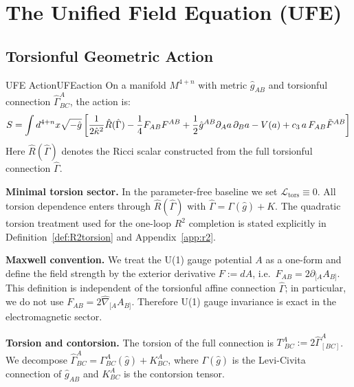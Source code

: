 \section{The Unified Field Equation (UFE)}

\subsection{Torsionful Geometric Action}

\begin{definition}{UFE Action}{UFEaction}
On a manifold $M^{4+n}$ with metric $\hat{g}_{AB}$ and torsionful connection 
$\hat{\Gamma}^A_{BC}$, the action is:
\begin{equation}
    S = \int d^{4+n}x\sqrt{-\hat{g}}\left[
        \frac{1}{2\hat{\kappa}^2}\hat{R}(\hat{\Gamma}) 
        - \frac{1}{4}F_{AB}F^{AB}
        + \frac{1}{2}\hat{g}^{AB}\partial_A a\,\partial_B a 
        - V(a) 
        + c_3\, a\, F_{AB}\tilde{F}^{AB}
    \right]
\end{equation}
Here $\hat{R}(\hat{\Gamma})$ denotes the Ricci scalar constructed from the full torsionful connection $\hat{\Gamma}$.
\end{definition}

\noindent\textbf{Minimal torsion sector.} In the parameter-free baseline we set $\mathcal{L}_{\mathrm{tors}}\equiv 0$.
All torsion dependence enters through $\hat{R}(\hat{\Gamma})$ with $\hat{\Gamma}=\Gamma(\hat{g})+K$.
The quadratic torsion treatment used for the one-loop $R^2$ completion is stated explicitly in Definition~\ref{def:R2torsion} and Appendix~\ref{app:r2}.

\noindent\textbf{Maxwell convention.} We treat the U(1) gauge potential $A$ as a one-form and define the field strength by the exterior derivative
$F := dA$, i.e.\ $F_{AB}=2\partial_{[A}A_{B]}$. This definition is independent of the torsionful affine connection $\hat{\Gamma}$; in particular, we do not use $F_{AB}=2\hat{\nabla}_{[A}A_{B]}$. Therefore U(1) gauge invariance is exact in the electromagnetic sector.

\noindent\textbf{Torsion and contorsion.} The torsion of the full connection is $T^A_{\;BC}:=2\hat{\Gamma}^A_{[BC]}$. We decompose
$\hat{\Gamma}^A_{BC}=\Gamma^A_{BC}(\hat{g})+K^A_{BC}$, where $\Gamma(\hat{g})$ is the Levi-Civita connection of $\hat{g}_{AB}$ and $K^A_{BC}$ is the contorsion tensor.

